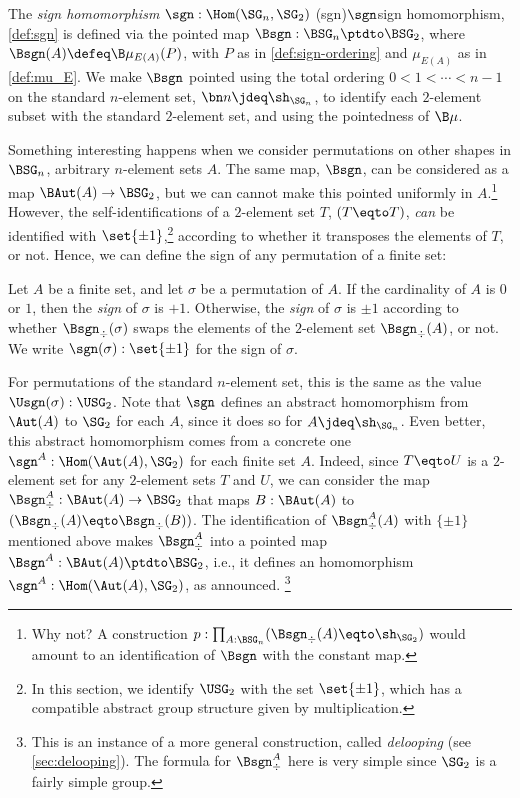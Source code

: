 \begin{definition}\label{def:sgn}
  The \emph{sign homomorphism} $\sgn : \Hom(\SG_n,\SG_2)$%
  \glossary(sgn){$\protect\sgn$}{sign homomorphism, \cref{def:sgn}}
  is defined via the pointed map $\Bsgn : \BSG_n \ptdto \BSG_2$,
  where $\Bsgn(A) \defeq \B\mu_{E(A)}(P)$, with $P$ as in
  \cref{def:sign-ordering} and $\mu_{E(A)}$ as in \cref{def:mu_E}.
  We make $\Bsgn$ pointed using the total ordering 
  $0 < 1 < \cdots < n-1$ on the standard $n$-element set, 
  $\bn n \jdeq \sh_{\SG_n}$, to identify each $2$-element 
  subset with the standard $2$-element set,
  and using the pointedness of $\B\mu$.
\end{definition}
Something interesting happens when we consider 
permutations on other shapes in $\BSG_n$,
\ie arbitrary $n$-element sets $A$.
The same map, $\Bsgn$, can be considered as a map $\BAut(A) \to \BSG_2$,
but we can cannot make this pointed uniformly in $A$.\footnote{%
  Why not? A construction $p : \prod_{A:\BSG_n}(\Bsgn_\div(A) \eqto \sh_{\SG_2})$
  would amount to an identification of $\Bsgn$ with the constant map.}
However, the self-identifications of a $2$-element set $T$, $(T \eqto T)$,
\emph{can} be identified with $\set{\pm1}$,\footnote{%
  In this section, we identify $\USG_2$ with the set $\set{\pm1}$,
  which has a compatible abstract group structure given by multiplication.}
according to whether it transposes the elements of $T$, or not.
Hence, we can define the sign of any permutation of a finite set:
\begin{definition}\label{def:sgn-permutation}
  Let $A$ be a finite set, and let $\sigma$ be a permutation of $A$.
  If the cardinality of $A$ is $0$ or $1$,
  then the \emph{sign} of $\sigma$ is $+1$.
  Otherwise, the \emph{sign} of $\sigma$ is $\pm1$ according to whether
  $\Bsgn_\div(\sigma)$ swaps the elements of the $2$-element 
  set $\Bsgn_\div(A)$, or not.
  We write $\sgn(\sigma):\set{\pm1}$ for the sign of $\sigma$.
\end{definition}
For permutations of the standard $n$-element set, this is the same as the value
$\Usgn(\sigma) : \USG_2$. Note that $\sgn$ defines an abstract homomorphism from
$\Aut(A)$ to $\SG_2$ for each $A$, since it does so for $A \jdeq
\sh_{\SG_n}$. Even better, this abstract homomorphism comes from a concrete one
$\sgn^A : \Hom(\Aut(A),\SG_2)$ for each finite set $A$. Indeed, since
$T \eqto U$ is a $2$-element set for any $2$-element sets $T$ and $U$, we can
consider the map $\Bsgn^A_\div : \BAut(A) \to \BSG_2$ that maps
$B : \BAut(A)$ to $(\Bsgn_\div(A) \eqto \Bsgn_\div(B))$. The identification of
$\Bsgn^A_\div(A)$ with $\{\pm1\}$ mentioned above makes $\Bsgn^A_\div$ into a
pointed map $\Bsgn^A : \BAut(A) \ptdto \BSG_2$, i.e., it defines an homomorphism
$\sgn^A : \Hom(\Aut(A),\SG_2)$, as announced.%
\footnote{This is an instance of a more general construction, called {\em
    delooping} (see \cref{sec:delooping}). The formula for $\Bsgn^A_\div$ here is
  very simple since $\SG_2$ is a fairly simple group.} %

